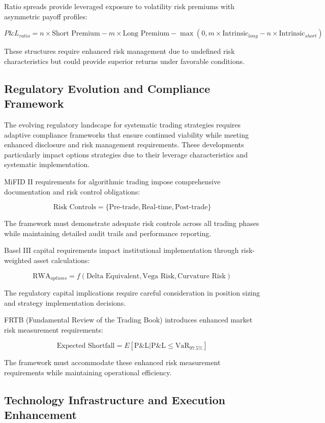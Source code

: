 \documentclass[
  american,
  11pt,
  11pt,
  letterpaper,
  onecolumn]{article}
\begin{document}
Ratio spreads provide leveraged exposure to volatility risk premiums
with asymmetric payoff profiles:

\[P\&L_{ratio} = n \times \text{Short Premium} - m \times \text{Long Premium} - \max(0, m \times \text{Intrinsic}_{long} - n \times \text{Intrinsic}_{short})\]

These structures require enhanced risk management due to undefined risk
characteristics but could provide superior returns under favorable
conditions.

\subsection{Regulatory Evolution and Compliance
Framework}\label{regulatory-evolution-and-compliance-framework}

The evolving regulatory landscape for systematic trading strategies
requires adaptive compliance frameworks that ensure continued viability
while meeting enhanced disclosure and risk management requirements.
These developments particularly impact options strategies due to their
leverage characteristics and systematic implementation.

MiFID II requirements for algorithmic trading impose comprehensive
documentation and risk control obligations:

\[\text{Risk Controls} = \{\text{Pre-trade}, \text{Real-time}, \text{Post-trade}\}\]

The framework must demonstrate adequate risk controls across all trading
phases while maintaining detailed audit trails and performance
reporting.

Basel III capital requirements impact institutional implementation
through risk-weighted asset calculations:

\[\text{RWA}_{options} = f(\text{Delta Equivalent}, \text{Vega Risk}, \text{Curvature Risk})\]

The regulatory capital implications require careful consideration in
position sizing and strategy implementation decisions.

FRTB (Fundamental Review of the Trading Book) introduces enhanced market
risk measurement requirements:

\[\text{Expected Shortfall} = E[\text{P\&L} | \text{P\&L} \leq \text{VaR}_{97.5\%}]\]

The framework must accommodate these enhanced risk measurement
requirements while maintaining operational efficiency.

\subsection{Technology Infrastructure and Execution
Enhancement}\label{technology-infrastructure-and-execution-enhancement}
\end{document}
